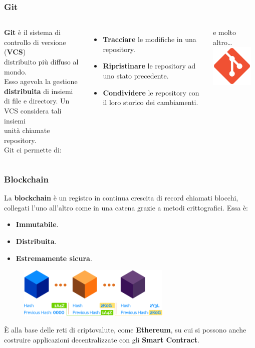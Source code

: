 \documentclass{beamer}
\begin{document}
\begin{frame}
	\frametitle{Git}

	\begin{columns}[T]
		\textbf{Git} è il sistema di controllo di versione (\textbf{VCS}) \\
		distribuito più diffuso al mondo. \\
		Esso agevola la gestione \textbf{distribuita} di insiemi\\di file e directory.
		Un VCS considera tali insiemi\\unità chiamate repository.\\
		Git ci permette di:
		\begin{itemize}
			\item \textbf{Tracciare} le modifiche in una repository.
			\item \textbf{Ripristinare} le repository ad uno stato precedente.
			\item \textbf{Condividere} le repository con il loro storico dei cambiamenti.
		\end{itemize}
		e molto altro\dots
		\hspace*{-2cm}
		\includegraphics[width=2cm]{figures/git.png}
	\end{columns}

\end{frame}

\begin{frame}
	\frametitle{Blockchain}
	La \textbf{blockchain} è un registro in continua crescita di
	record chiamati blocchi, collegati l'uno all'altro come in una
	catena grazie a metodi crittografici.
	Essa è:
	\begin{itemize}
		\item \textbf{Immutabile}.
		\item \textbf{Distribuita}.
		\item \textbf{Estremamente sicura}.
	\end{itemize}
	\begin{figure}
		\includegraphics[width=0.65\textwidth]{figures/blockchain.png}
	\end{figure}
	\pause
	È alla base delle reti di criptovalute, come \textbf{Ethereum},
	su cui si possono anche costruire applicazioni decentralizzate con gli
	\textbf{Smart Contract}.
\end{frame}
\end{document}
